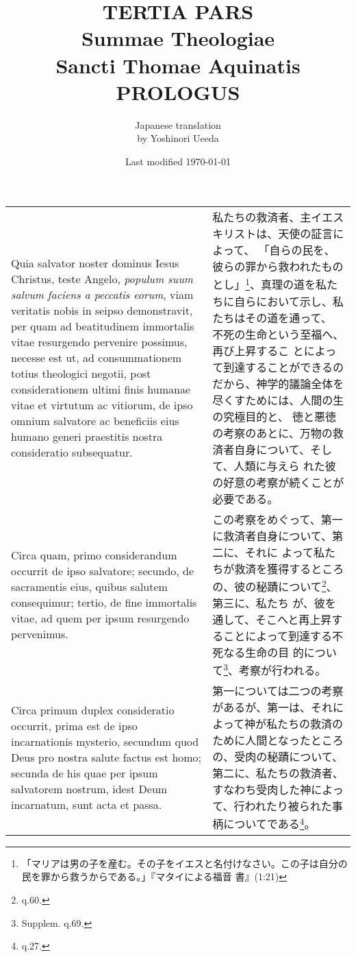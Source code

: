 \documentclass[10pt]{jsarticle} %
\title{{\bf TERTIA PARS}\\{\HUGE Summae Theologiae}\\Sancti Thomae
Aquinatis\\{\sffamily PROLOGUS}}
\author{Japanese translation\\by Yoshinori {\sc Ueeda}}
\date{Last modified \today}
\begin{document}
\maketitle
\pagestyle{fancy}


\begin{longtable}{p{21em}p{21em}}
Quia salvator noster dominus Iesus Christus, teste Angelo, {\it populum
suum salvum faciens a peccatis eorum}, viam veritatis nobis in seipso
demonstravit, per quam ad beatitudinem immortalis vitae resurgendo
pervenire possimus, necesse est ut, ad consummationem totius theologici
negotii, post considerationem ultimi finis humanae vitae et virtutum ac
vitiorum, de ipso omnium salvatore ac beneficiis eius humano generi
praestitis nostra consideratio subsequatur. 


&


私たちの救済者、主イエスキリストは、天使の証言によって、
「自らの民を、彼らの罪から救われたものとし」\footnote{「マリアは男の子を産む。その子をイエスと名付けなさい。この子は自分の民を罪から救うからである。」『マタイによる福音
 書』(1:21)}、真理の道を私たちに自らにおいて示し、私たちはその道を通って、
 不死の生命という至福へ、再び上昇するこ
 とによって到達することができるのだから、神学的議論全体を尽くすためには、人間の生の究極目的と、
 徳と悪徳の考察のあとに、万物の救済者自身について、そして、人類に与えら
 れた彼の好意の考察が続くことが必要である。


\\

Circa quam, primo
considerandum occurrit de ipso salvatore; secundo, de sacramentis eius,
quibus salutem consequimur; tertio, de fine immortalis vitae, ad quem
per ipsum resurgendo pervenimus. 


&


この考察をめぐって、第一に救済者自身について、第二に、それに
 よって私たちが救済を獲得するところの、彼の秘蹟について\footnote{q.60.}、第三に、私たち
 が、彼を通して、そこへと再上昇することによって到達する不死なる生命の目
 的について\footnote{Supplem. q.69.}、考察が行われる。



\\


Circa primum duplex consideratio
occurrit, prima est de ipso incarnationis mysterio, secundum quod Deus
pro nostra salute factus est homo; secunda de his quae per ipsum
salvatorem nostrum, idest Deum incarnatum, sunt acta et passa.

&


第一については二つの考察があるが、第一は、それによって神が私たちの救済の
 ために人間となったところの、受肉の秘蹟について、第二に、私たちの救済者、
 すなわち受肉した神によって、行われたり被られた事柄についてである\footnote{q.27.}。

\end{longtable}
\end{document}
